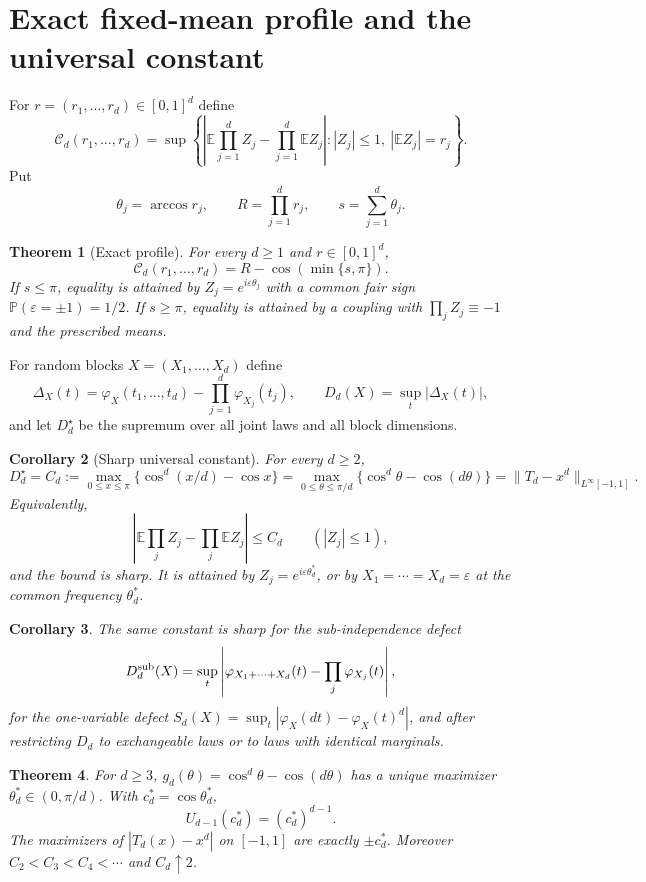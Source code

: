 \documentclass[11pt]{article}
\newtheorem{theorem}{Theorem}[section]
\newtheorem{corollary}[theorem]{Corollary}
\theoremstyle{definition}\newtheorem{definition}[theorem]{Definition}
\theoremstyle{remark}\newtheorem{remark}[theorem]{Remark}
\begin{document}
\section{Exact fixed-mean profile and the universal constant}
For $r=(r_1,\ldots,r_d)\in[0,1]^d$ define
\[
\mathcal C_d(r_1,\ldots,r_d)=\sup\left\{\left|\mathbb E\prod_{j=1}^dZ_j-\prod_{j=1}^d\mathbb EZ_j\right|:
|Z_j|\le1,\ |\mathbb EZ_j|=r_j\right\}.
\]
Put
\[
\theta_j=\arccos r_j,\qquad R=\prod_{j=1}^dr_j,\qquad s=\sum_{j=1}^d\theta_j.
\]

\begin{theorem}[Exact profile]\label{thm:profile}
For every $d\ge1$ and $r\in[0,1]^d$,
\[
\boxed{\mathcal C_d(r_1,\ldots,r_d)=R-\cos(\min\{s,\pi\}).}
\]
If $s\le\pi$, equality is attained by $Z_j=e^{i\varepsilon\theta_j}$ with a common fair sign
$\mathbb P(\varepsilon=\pm1)=1/2$. If $s\ge\pi$, equality is attained by a coupling with
$\prod_jZ_j\equiv-1$ and the prescribed means.
\end{theorem}

For random blocks $X=(X_1,\ldots,X_d)$ define
\[
\Delta_X(t)=\varphi_X(t_1,\ldots,t_d)-\prod_{j=1}^d\varphi_{X_j}(t_j),\qquad
D_d(X)=\sup_t|\Delta_X(t)|,
\]
and let $D_d^\star$ be the supremum over all joint laws and all block dimensions.

\begin{corollary}[Sharp universal constant]\label{thm:main}
For every $d\ge2$,
\[
\boxed{
D_d^\star=C_d:=\max_{0\le x\le\pi}\{\cos^d(x/d)-\cos x\}
=\max_{0\le\theta\le\pi/d}\{\cos^d\theta-\cos(d\theta)\}
=\|T_d-x^d\|_{L^\infty[-1,1]}.
}
\]
Equivalently,
\[
\left|\mathbb E\prod_jZ_j-\prod_j\mathbb EZ_j\right|\le C_d\qquad(|Z_j|\le1),
\]
and the bound is sharp. It is attained by $Z_j=e^{i\varepsilon\theta_d^*}$, or by
$X_1=\cdots=X_d=\varepsilon$ at the common frequency $\theta_d^*$.
\end{corollary}

\begin{corollary}\label{cor:forms}
The same constant is sharp for the sub-independence defect
\[
D_d^{\rm sub}(X)=\sup_t\left|\varphi_{X_1+\cdots+X_d}(t)-\prod_j\varphi_{X_j}(t)\right|,
\]
for the one-variable defect $S_d(X)=\sup_t|\varphi_X(dt)-\varphi_X(t)^d|$, and after restricting $D_d$ to exchangeable
laws or to laws with identical marginals.
\end{corollary}

\begin{theorem}\label{thm:unique}
For $d\ge3$, $g_d(\theta)=\cos^d\theta-\cos(d\theta)$ has a unique maximizer $\theta_d^*\in(0,\pi/d)$. With
$c_d^*=\cos\theta_d^*$,
\[
U_{d-1}(c_d^*)=(c_d^*)^{d-1}.
\]
The maximizers of $|T_d(x)-x^d|$ on $[-1,1]$ are exactly $\pm c_d^*$. Moreover $C_2<C_3<C_4<\cdots$ and $C_d\uparrow2$.
\end{theorem}
\end{document}
